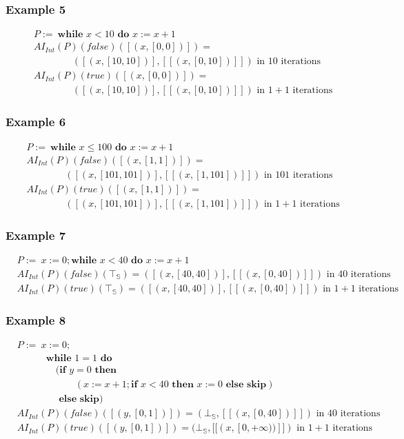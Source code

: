 \documentclass[aspectratio=169]{beamer}
\begin{document}
\begin{frame}
    \frametitle{Example 5}
    \begin{align*}
        &P :=\ \textbf {while } x < 10 \textbf { do } x := x + 1 \\
        &AI_{Int} (P) (false) ([(x, [0, 0])]) =\\
        & \qquad \qquad ([(x, [10, 10])], [[(x, [0, 10])]]) \text{ in $10$ iterations}\\
        &AI_{Int} (P) (true) ([(x, [0, 0])]) =\\
        & \qquad \qquad ([(x, [10, 10])], [[(x, [0, 10])]]) \text{ in $1 + 1$ iterations}
    \end{align*}
\end{frame}

\begin{frame}
    \frametitle{Example 6}
    \begin{align*}
        &P :=\ \textbf {while } x \le 100 \textbf { do } x := x + 1 \\
        &AI_{Int} (P) (false) ([(x, [1, 1])]) =\\
        & \qquad \qquad ([(x, [101, 101])], [[(x, [1, 101])]]) \text{ in $101$ iterations}\\
        &AI_{Int} (P) (true) ([(x, [1, 1])]) =\\
        & \qquad \qquad ([(x, [101, 101])], [[(x, [1, 101])]]) \text{ in $1 + 1$ iterations}
    \end{align*}
\end{frame}

\begin{frame}
    \frametitle{Example 7}
    \begin{align*}
        &P :=\ x := 0; \textbf {while } x < 40 \textbf { do } x := x + 1 \\
        &AI_{Int} (P) (false) (\top_\mathbb{S}) = ([(x, [40, 40])], [[(x, [0, 40])]]) \text{ in $40$ iterations}\\
        &AI_{Int} (P) (true) (\top_\mathbb{S}) = ([(x, [40, 40])], [[(x, [0, 40])]]) \text{ in $1 + 1$ iterations}
    \end{align*}
\end{frame}

\begin{frame}
    \frametitle{Example 8}
    \begin{align*}
        &P :=\ x := 0;\\
        & \qquad \quad     \textbf {while } 1 = 1 \textbf { do } \\
        & \qquad \qquad (\textbf {if } y = 0 \textbf { then } \\
        & \qquad \qquad \qquad (x := x + 1; \textbf {if } x < 40 \textbf { then } x := 0 \textbf { else skip})\\
        & \qquad \qquad \textbf { else skip}) \\
        &AI_{Int} (P) (false) ([(y, [0, 1])]) = (\bot_\mathbb{S}, [[(x, [0, 40])]]) \text{ in $40$ iterations}\\
        &AI_{Int} (P) (true) ([(y, [0, 1])]) = (\bot_\mathbb{S}, [[(x, [0, +\infty))]]) \text{ in $1 + 1$ iterations}
    \end{align*}
\end{frame}
\end{document}
